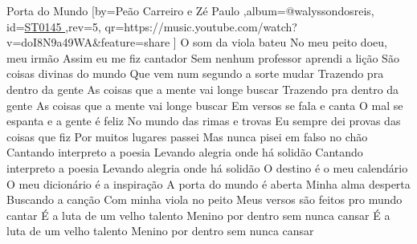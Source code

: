 \beginsong
{Porta do Mundo %
}[by={Peão Carreiro e Zé Paulo %
},album={@walyssondosreis},
id={\href{https://music.youtube.com/watch?v=doI8N9a49WA&feature=share %
}{ST0145 %
}},rev={5}, %
qr={https://music.youtube.com/watch?v=doI8N9a49WA&feature=share %
}]
\beginverse
O som da viola bateu
No meu peito doeu, meu irmão
Assim eu me fiz cantador
Sem nenhum professor aprendi a lição
São coisas divinas do mundo
Que vem num segundo a sorte mudar
Trazendo pra dentro da gente
As coisas que a mente vai longe buscar
Trazendo pra dentro da gente
As coisas que a mente vai longe buscar
\endverse
\beginverse
Em versos se fala e canta
O mal se espanta e a gente é feliz
No mundo das rimas e trovas
Eu sempre dei provas das coisas que fiz
Por muitos lugares passei
Mas nunca pisei em falso no chão
Cantando interpreto a poesia
Levando alegria onde há solidão
Cantando interpreto a poesia
Levando alegria onde há solidão
\endverse
{}
\beginverse
O destino é o meu calendário
O meu dicionário é a inspiração
A porta do mundo é aberta
Minha alma desperta
Buscando a canção
Com minha viola no peito
Meus versos são feitos pro mundo cantar
É a luta de um velho talento
Menino por dentro sem nunca cansar
É a luta de um velho talento
Menino por dentro sem nunca cansar
\endverse
\vspace{4em} %
\begin{comment}
\lstset{basicstyle=\scriptsize\bf} %
\tab{Solo 1}
\begin{lstlisting}
E|-----------------------------------------------------|
B|-----------------------------------------------------|
G|-----------------------------------------------------|
D|-----------------------------------------------------|
A|-----------------------------------------------------|
E|-----------------------------------------------------|
\end{lstlisting}
\end{comment}
